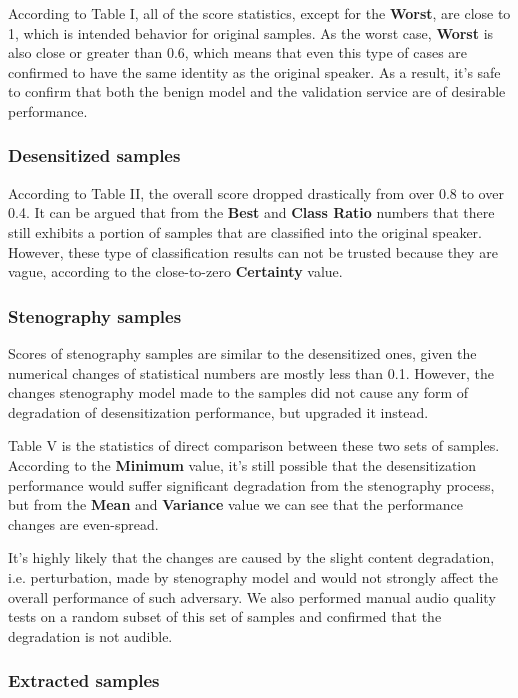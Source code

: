 \documentclass[journal]{IEEEtran} %
\begin{document}
\begin{CJK*}{UTF8}{gbsn}
According to Table I, all of the score statistics, except for the \textbf{Worst}, are close to 1, which is intended behavior for original samples. As the worst case, \textbf{Worst} is also close or greater than 0.6, which means that even this type of cases are confirmed to have the same identity as the original speaker. As a result, it's safe to confirm that both the benign model and the validation service are of desirable performance.

\subsubsection{Desensitized samples}

According to Table II, the overall score dropped drastically from over 0.8 to over 0.4. It can be argued that from the \textbf{Best} and \textbf{Class Ratio} numbers that there still exhibits a portion of samples that are classified into the original speaker. However, these type of classification results can not be trusted because they are vague, according to the close-to-zero \textbf{Certainty} value.

\subsubsection{Stenography samples}

Scores of stenography samples are similar to the desensitized ones, given the numerical changes of statistical numbers are mostly less than 0.1. However, the changes stenography model made to the samples did not cause any form of degradation of desensitization performance, but upgraded it instead.

Table V is the statistics of direct comparison between these two sets of samples. According to the \textbf{Minimum} value, it's still possible that the desensitization performance would suffer significant degradation from the stenography process, but from the \textbf{Mean} and \textbf{Variance} value we can see that the performance changes are even-spread.

It's highly likely that the changes are caused by the slight content degradation, i.e. perturbation, made by stenography model and would not strongly affect the overall performance of such adversary. We also performed manual audio quality tests on a random subset of this set of samples and confirmed that the degradation is not audible.

\subsubsection{Extracted samples}


\end{CJK*}
\end{document}

